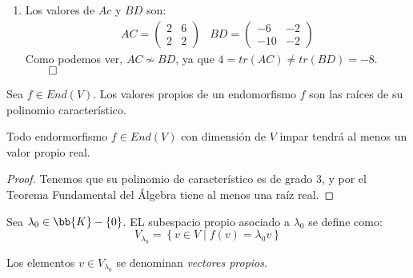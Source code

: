 \begin{ejercicio*}
\begin{enumerate}
        \item Los valores de $Ac$ y $BD$ son:
        \begin{equation*}\begin{array}{cc}
            AC = \left(\begin{array}{cc}
                2 & 6 \\
                2 & 2
            \end{array} \right) &
            BD = \left(\begin{array}{cc}
                -6 & -2 \\
                -10 & -2
            \end{array} \right)
        \end{array}\end{equation*}
        Como podemos ver, $AC\nsim BD$, ya que $4=tr(AC) \neq tr(BD)=-8$. $\hfill \qed$
    \end{enumerate}
\end{ejercicio*}



\begin{definicion}
    Sea $f\in End(V)$. Los valores propios de un endomorfismo $f$ son las raíces de su polinomio característico.
\end{definicion}


\begin{prop}
    Todo endormorfismo $f\in End(V)$ con dimensión de $V$ impar tendrá al menos un valor propio real.
\end{prop}
\begin{proof}
    Tenemos que su polinomio de característico es de grado 3, y por el Teorema Fundamental del Álgebra tiene al menos una raíz real.
\end{proof}

\begin{definicion} Sea $\lambda_0\in \bb{K}-\{0\}$. EL subespacio propio asociado a $\lambda_0$ se define como:
    \begin{equation*}
        V_{\lambda_0} = \left\{ v\in V \mid f(v)=\lambda_0 v \right\}
    \end{equation*}

    Los elementos $v\in V_{\lambda_0}$ se denominan \emph{vectores propios}.
\end{definicion}

